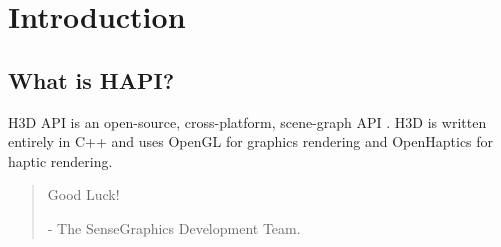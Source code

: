 
\chapter{Introduction}

\section{What is HAPI?}
H3D API is an open-source, cross-platform, scene-graph API . H3D is
written entirely in C++ and uses OpenGL for graphics rendering and
OpenHaptics for haptic rendering.


\begin{quotation}
Good Luck!

- The SenseGraphics Development Team.
\end{quotation}




 


